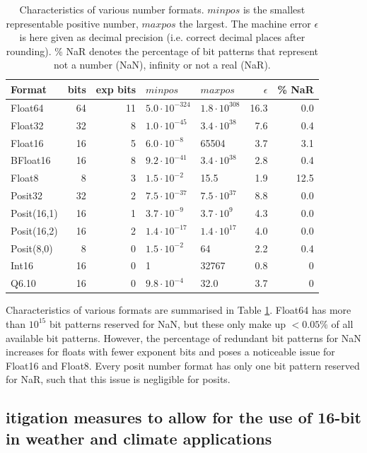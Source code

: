\documentclass[draft]{agujournal2019}
\begin{document}
\begin{table}[htbp]
\center
\begin{tabular}{l | r | r | l | l | r | r}
Format & bits & exp bits & $minpos$ & $maxpos$ & $\epsilon$ &  \% NaR \\
\hline
Float64    & 64 & 11 & $5.0 \cdot 10^{-324}$ & $1.8 \cdot 10^{308}$  & 16.3 & 0.0 \\
Float32    & 32 & 8 & $1.0 \cdot 10^{-45}$ & $3.4 \cdot 10^{38}$ & 7.6 & 0.4 \\
Float16    & 16 & 5 & $6.0 \cdot 10^{-8}$ & 65504 & 3.7 & 3.1 \\
BFloat16    & 16 & 8 & $ 9.2 \cdot 10^{-41}$ & $3.4 \cdot 10^{38}$ & 2.8 & 0.4  \\
Float8 & 8 & 3 & $1.5 \cdot 10^{-2}$ & 15.5 & 1.9 &12.5\\
\hline
Posit32    & 32 & 2 &  $7.5 \cdot 10^{-37}$ & $7.5 \cdot 10^{37}$ & 8.8 & 0.0 \\
Posit(16,1) & 16 & 1 & $3.7 \cdot 10^{-9}$ & $3.7 \cdot 10^{9}$ & 4.3 & 0.0\\
Posit(16,2) & 16 & 2 & $1.4 \cdot 10^{-17}$ & $1.4 \cdot 10^{17}$ & 4.0 & 0.0\\
Posit(8,0) & 8 & 0 & $1.5 \cdot 10^{-2}$ & 64 & 2.2 & 0.4  \\
\hline
Int16 & 16 & 0 & 1 & 32767 & 0.8 & 0\\
Q6.10 & 16 & 0 & $9.8 \cdot 10^{-4}$ & 32.0 & 3.7 & 0
\end{tabular}
\vspace{10pt}
\caption{Characteristics of various number formats. $minpos$ is the smallest
representable positive number, $maxpos$ the largest. The machine error $\epsilon$
is here given as decimal precision (i.e. correct decimal places after rounding).
\% NaR denotes the percentage of bit patterns that represent not a number (NaN),
infinity or not a real (NaR).}
\label{tab:formats}
\end{table}

Characteristics of various formats are summarised in Table \ref{tab:formats}.
Float64 has more than $10^{15}$ bit patterns reserved for NaN, but these only
make up $< 0.05\%$ of all available bit patterns. However, the percentage of
redundant bit patterns for NaN increases for floats with fewer exponent bits
and poses a noticeable issue for Float16 and Float8. Every posit number format
has only one bit pattern reserved for NaR, such that this issue is negligible for
posits.

\subsection{itigation measures to allow for the use of 16-bit  in
weather and climate applications}
\end{document}

